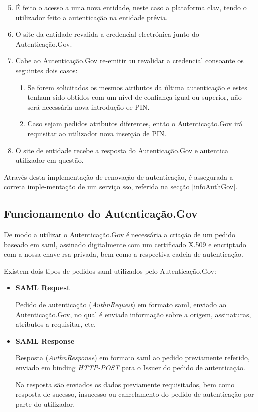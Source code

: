 \begin{enumerate}
    \setcounter{enumi}{4}
    \item É feito o acesso a uma nova entidade, neste caso a plataforma \gls{clav}, tendo o utilizador feito a autenticação na entidade prévia.
    \item O site da entidade revalida a credencial electrónica junto do Autenticação.Gov.
    \item Cabe ao Autenticação.Gov re-emitir ou revalidar a credencial consoante os seguintes dois casos:
    \begin{enumerate}
        \item Se forem solicitados os mesmos atributos da última autenticação e estes tenham sido obtidos com um nível de confiança igual ou superior, não será necessária nova introdução de PIN.
        \item Caso sejam pedidos atributos diferentes, então o Autenticação.Gov irá requisitar ao utilizador nova inserção de PIN.
    \end{enumerate}
    \item O site de entidade recebe a resposta do Autenticação.Gov e autentica utilizador em questão.
\end{enumerate}

Através desta implementação de renovação de autenticação, é assegurada a correta imple-mentação de um serviço \gls{sso}, referida na secção \ref{infoAuthGov}.

\cleardoublepage
\subsection{Funcionamento do Autenticação.Gov} \label{funcAuthGov}

De modo a utilizar o Autenticação.Gov é necessária a criação de um pedido baseado em \gls{saml}, assinado digitalmente com um certificado X.509 e encriptado com a nossa chave \gls{rsa} privada, bem como a respectiva cadeia de autenticação.

Existem dois tipos de pedidos \gls{saml} utilizados pelo Autenticação.Gov:

\begin{itemize}
    \item \textbf{SAML Request}
    
    Pedido de autenticação (\emph{AuthnRequest}) em formato \gls{saml}, enviado ao Autenticação.Gov, no qual é enviada informação sobre a origem, assinaturas, atributos a requisitar, etc.
    
    \item \textbf{SAML Response}
    
    Resposta (\emph{AuthnResponse}) em formato \gls{saml} ao pedido previamente referido, enviado em binding \emph{HTTP-POST} para o Issuer do pedido de autenticação.
    
    Na resposta são enviados os dados previamente requisitados, bem como resposta de sucesso, insucesso ou cancelamento do pedido de autenticação por parte do utilizador.
\end{itemize}

